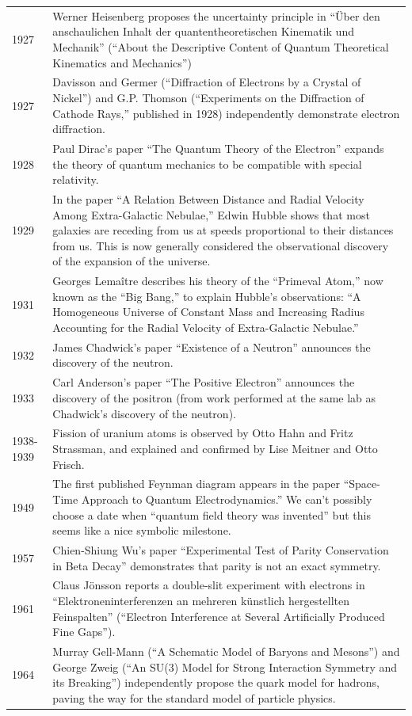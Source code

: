 \documentclass[../../../main.tex]{subfiles}
\begin{document}
\begin{center}
\begin{longtable}{p{}  p{}}
1927&Werner Heisenberg proposes the uncertainty principle in “Über den anschaulichen Inhalt der quantentheoretischen Kinematik und Mechanik” (“About the Descriptive Content of Quantum Theoretical Kinematics and Mechanics”)\\
1927&Davisson and Germer (“Diffraction of Electrons by a Crystal of Nickel”) and G.P. Thomson (“Experiments on the Diffraction of Cathode Rays,” published in 1928) independently demonstrate electron diffraction.\\
1928&Paul Dirac's paper “The Quantum Theory of the Electron” expands the theory of quantum mechanics to be compatible with special relativity.\\
1929&In the paper “A Relation Between Distance and Radial Velocity Among Extra-Galactic Nebulae,” Edwin Hubble shows that most galaxies are receding from us at speeds proportional to their distances from us. This is now generally considered the observational discovery of the expansion of the universe.\\
1931&Georges Lemaître describes his theory of the “Primeval Atom,” now known as the “Big Bang,” to explain Hubble's observations: “A Homogeneous Universe of Constant Mass and Increasing Radius Accounting for the Radial Velocity of Extra-Galactic Nebulae.”\\
1932&James Chadwick's paper “Existence of a Neutron” announces the discovery of the neutron.\\
1933&Carl Anderson's paper “The Positive Electron” announces the discovery of the positron (from work performed at the same lab as Chadwick's discovery of the neutron).\\
1938-1939&Fission of uranium atoms is observed by Otto Hahn and Fritz Strassman, and explained and confirmed by Lise Meitner and Otto Frisch. \\
1949&The first published Feynman diagram appears in the paper “Space-Time Approach to Quantum Electrodynamics.” We can't possibly choose a date when “quantum field theory was invented” but this seems like a nice symbolic milestone.\\
1957&Chien-Shiung Wu's paper “Experimental Test of Parity Conservation in Beta Decay” demonstrates that parity is not an exact symmetry.\\
1961&Claus Jönsson reports a double-slit experiment with electrons in “Elektroneninterferenzen an mehreren künstlich hergestellten Feinspalten” (“Electron Interference at Several Artificially Produced Fine Gaps”).\\
1964&Murray Gell-Mann (“A Schematic Model of Baryons and Mesons”) and George Zweig (“An SU(3) Model for Strong Interaction Symmetry and its Breaking”) independently propose the quark model for hadrons, paving the way for the standard model of particle physics.\\

\end{longtable}
\end{center}
\end{document}

